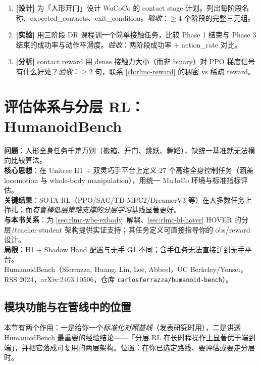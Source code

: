 \begin{practice}[本节动手]
\begin{enumerate}
  \item \textbf{[设计]} 为「人形开门」设计 WoCoCo 的 contact stage 计划。列出每阶段名称、expected\_contacts、exit\_condition。\emph{验收}：$\geq 4$ 个阶段的完整三元组。
  \item \textbf{[实验]} 用三阶段 DR 课程训一个简单接触任务，比较 Phase 1 结束与 Phase 3 结束的成功率与动作平滑度。\emph{验收}：两阶段成功率 $+$ action\_rate 对比。
  \item \textbf{[分析]} contact reward 用 dense 接触力大小（而非 binary）对 PPO 梯度信号有什么好处？\emph{验收}：$\geq 2$ 句，联系 \cref{ch:rlmc-reward} 的稠密 vs 稀疏 reward。
\end{enumerate}
\end{practice}

\section{评估体系与分层 RL：HumanoidBench}\label{sec:rlmc-wbc-bench}

\begin{paper}\label{paper:rlmc-wbc-bench}
\textbf{问题}：人形全身任务千差万别（搬箱、开门、跳跃、舞蹈），缺统一基准就无法横向比较算法。\\
\textbf{核心思想}：在 Unitree H1 $+$ 双灵巧手平台上定义 $27$ 个高维全身控制任务（涵盖 locomotion 与 whole-body manipulation），用统一 MuJoCo 环境与标准指标评估。\\
\textbf{关键结果}：SOTA RL（PPO/SAC/TD-MPC2/DreamerV3 等）在大多数任务上挣扎；而\emph{有鲁棒低层策略支撑的分层学习}基线显著更好。\\
\textbf{与本书关系}：为 \cref{sec:rlmc-wbc-exbody} 解耦、\cref{sec:rlmc-hl-hover} HOVER 的分层/teacher-student 架构提供实证支持；其任务定义可直接指导你的 obs/reward 设计。\\
\textbf{局限}：H1 $+$ Shadow Hand 配置与无手 G1 不同；含手任务无法直接迁到无手平台。\\
HumanoidBench（Sferrazza, Huang, Lin, Lee, Abbeel，UC Berkeley/Yonsei，RSS 2024，arXiv:2403.10506，仓库 \texttt{carlosferrazza/\allowbreak humanoid-bench}）\cite{sferrazza2024humanoidbench}。
\end{paper}

\subsection{模块功能与在管线中的位置}
本节有两个作用：一是给你一个\emph{标准化对照基线}（发表研究时用），二是讲透 HumanoidBench 最重要的经验结论——「分层 RL 在长时程操作上显著优于端到端」，并把它落成可复用的两层架构。位置：在你已选定路线、要评估或要走分层时。

